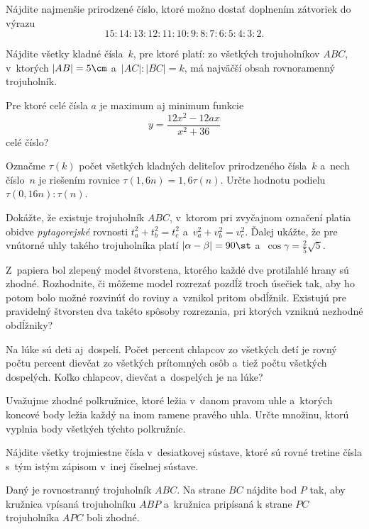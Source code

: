 ﻿{%
Nájdite najmenšie prirodzené číslo, ktoré možno dostať doplnením zátvoriek
do výrazu
$$
15:14:13:12:11:10:9:8:7:6:5:4:3:2.
$$}

{%
Nájdite všetky kladné čísla~$k$, pre ktoré platí: zo všetkých
trojuholníkov $ABC$,
v~ktorých $|AB|=5\cm$ a~$|AC|:|BC|=k$, má najväčší obsah
rovnoramenný trojuholník.}

{%
Pre ktoré  celé čísla $a$
je maximum aj minimum funkcie
$$
y=\frac{12x^2-12ax}{x^2+36}
$$
celé číslo?}

{%
Označme $\tau(k)$ počet všetkých kladných deliteľov prirodzeného
čísla~$k$ a~nech číslo~$n$ je riešením rovnice
$\tau(1{,}6n)=1{,}6\tau(n)$.
Určte hodnotu podielu $\tau(0{,}16n):\tau(n)$.}

{%
Dokážte, že existuje trojuholník $ABC$, v~ktorom pri zvyčajnom označení
platia obidve {\it pytagorejské\/} rovnosti $t_a^2+t_b^2=t_c^2$
a~$v_a^2+v_b^2=v_c^2$.
Ďalej ukážte, že pre vnútorné uhly takého
trojuholníka platí $|\alpha-\beta|=90\st$ a~$\cos\gamma=\frac25\sqrt5$.}

{%
Z~papiera bol zlepený model štvorstena, ktorého každé dve protiľahlé
hrany sú zhodné.
Rozhodnite, či môžeme model rozrezať pozdĺž troch úsečiek
tak, aby ho potom bolo možné rozvinúť do roviny a~vznikol pritom
obdĺžnik. Existujú pre pravidelný štvorsten dva takéto spôsoby
rozrezania, pri ktorých vzniknú nezhodné obdĺžniky?}

{%
Na lúke sú deti aj~dospelí. Počet percent chlapcov zo
všetkých detí je rovný počtu percent dievčat zo všetkých prítomných osôb
a~tiež počtu všetkých dospelých. Koľko chlapcov, dievčat a~dospelých
je na lúke?}

{%
Uvažujme zhodné polkružnice, ktoré ležia v~danom
pravom uhle a~ktorých koncové body ležia každý na inom ramene pravého
uhla.
Určte množinu, ktorú vyplnia body všetkých týchto polkružníc.}

{%
Nájdite všetky trojmiestne čísla v~desiatkovej sústave,
ktoré sú rovné tretine čísla s~tým istým zápisom v~inej číselnej sústave.}

{%
Daný je rovnostranný trojuholník $ABC$.
Na strane $BC$ nájdite bod $P$ tak, aby kružnica vpísaná trojuholníku
$ABP$ a~kružnica pripísaná k strane $PC$ trojuholníka $APC$
boli zhodné.}

